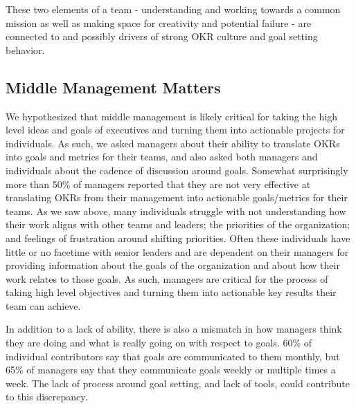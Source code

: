 \documentclass[sigconf, nonacm]{acmart}
\begin{document}
These two elements of a team - understanding and working towards a common mission as well as making space for creativity and potential failure - are connected to and possibly drivers of strong OKR culture and goal setting behavior. 

\subsection{Middle Management Matters}
We hypothesized that middle management is likely critical for taking the high level ideas and goals of executives and turning them into actionable projects for individuals. As such, we asked managers about their ability to translate OKRs into goals and metrics for their teams, and also asked both managers and individuals about the cadence of discussion around goals. Somewhat surprisingly more than 50\% of managers reported that they are not very effective at translating OKRs from their management into actionable goals/metrics for their teams. As we saw above, many individuals struggle with not understanding how their work aligns with other teams and leaders; the priorities of the organization; and feelings of frustration around shifting priorities. Often these individuals have little or no facetime with senior leaders and are dependent on their managers for providing information about the goals of the organization and about how their work relates to those goals. As such, managers are critical for the process of taking high level objectives and turning them into actionable key results their team can achieve. 

In addition to a lack of ability, there is also a mismatch in how managers think they are doing and what is really going on with respect to goals. 60\% of individual contributors say that goals are communicated to them monthly, but 65\% of managers say that they communicate goals weekly or multiple times a week. The lack of process around goal setting, and lack of tools, could contribute to this discrepancy. 
\end{document}
